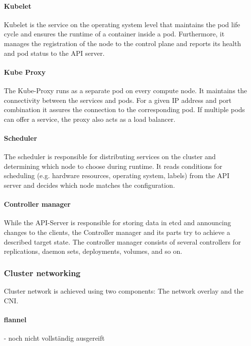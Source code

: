 \paragraph{Kubelet} Kubelet is the service on the operating system level that maintains the pod life cycle and ensures the runtime of a container inside a pod. Furthermore, it manages the registration of the node to the control plane and reports its health and pod status to the API server.

\paragraph{Kube Proxy} The Kube-Proxy runs as a separate pod on every compute node. It maintains the connectivity between the services and pods\cite{Luksa.2018}. For a given IP address and port combination it assures the connection to the corresponding pod. If multiple pods can offer a service, the proxy also acts as a load balancer\cite{Luksa.2018}.

\paragraph{Scheduler} The scheduler is responsible for distributing services on the cluster and determining which node to choose during runtime. It reads conditions for scheduling (e.g. hardware resources, operating system, labels) from the API server and decides which node matches the configuration\cite{Luksa.2018}.

\paragraph{Controller manager} While the API-Server is responsible for storing data in etcd and announcing changes to the clients, the Controller manager and its parts try to achieve a described target state\cite{Luksa.2018}. The controller manager consists of several controllers for replications, daemon sets, deployments, volumes, and so on.


\subsubsection{Cluster networking}
Cluster network is achieved using two components: The network overlay and the \ac{CNI}.


\paragraph{flannel}
- noch nicht vollständig ausgereift

